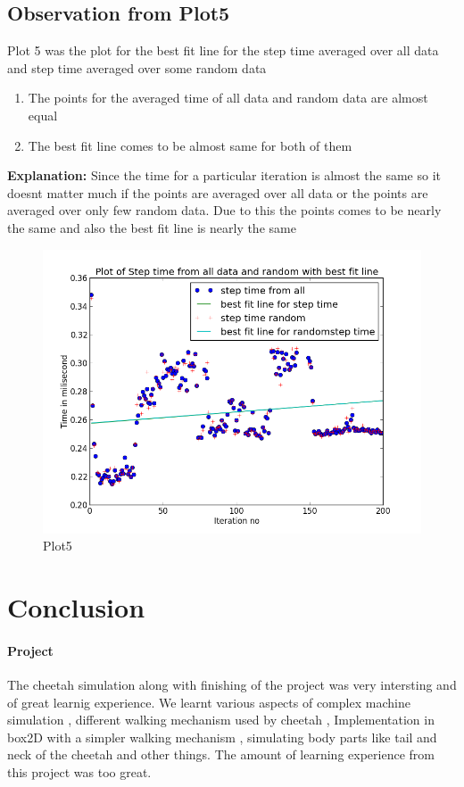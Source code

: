 \documentclass[11pt]{article}
\begin{document}
\subsection{Observation from Plot5}
Plot 5 was the plot for the best fit line for the step time averaged over all data and step time averaged over some random data
\begin{enumerate}
    \item The points for the averaged time of all data and random data are almost equal 
    \item The best fit line comes to be almost same for both of them
\end{enumerate}
\textbf{Explanation:}
	Since the time for a particular iteration is almost the same so it doesnt matter much if the points are averaged over all data or 
the  points are averaged over only few random data. Due to this the points comes to be nearly the same and also the best fit line is nearly 
the same
\begin{figure}[!ht]
	\centering
	\caption{Plot5}
		\includegraphics[scale=0.5]{../plots/g17_plot05.png}
\end{figure}
\section{Conclusion}
\paragraph{Project}
The cheetah simulation along with finishing of the project was very intersting and of great learnig experience. We learnt various aspects of complex machine simulation , different walking mechanism used by cheetah , Implementation in box2D with a simpler walking mechanism , simulating body parts like tail and neck of the cheetah and other things. The amount of learning experience from this project was too great.
\end{document}
